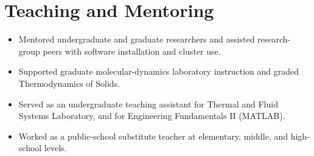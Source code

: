 \section{Teaching and Mentoring}
\begin{itemize}
    \item Mentored undergraduate and graduate researchers and assisted research-group peers with software installation and cluster use.
    \item Supported graduate molecular-dynamics laboratory instruction and graded Thermodynamics of Solids.
    \item Served as an undergraduate teaching assistant for Thermal and Fluid Systems Laboratory, and for Engineering Fundamentals II (MATLAB).
    \item Worked as a public-school substitute teacher at elementary, middle, and high-school levels.
\end{itemize}
